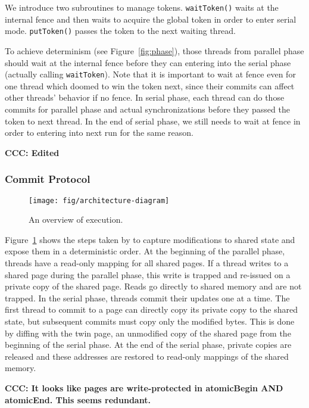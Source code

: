 We introduce two subroutines to manage tokens. \texttt{waitToken()}
waits at the internal fence and then waits to acquire the global token
in order to enter serial mode. \texttt{putToken()} passes the token to
the next waiting thread.

To achieve determinism (see Figure~\ref{fig:phase}), those threads from parallel phase 
should wait at the internal fence before they can entering into the serial phase (actually calling
\texttt{waitToken}).
Note that it is important to wait at fence even for one thread which doomed to win the token next,
since their commits can affect other threads' behavior if no fence.
In serial phase, each thread can do those commits for parallel phase and actual synchronizations
before they passed the token to next thread. 
In the end of serial phase, we still needs to wait at fence in order to entering into next run for the same reason.


\textbf{CCC: Edited}

\subsubsection{Commit Protocol}
\begin{figure}
{\centering
\texttt{[image: fig/architecture-diagram]}
\caption{An overview of \dthreads{} execution.\label{fig:architecture}}
}
\end{figure}

Figure~\ref{fig:architecture} shows the steps taken by \dthreads{} to capture modifications to shared state and expose them in a deterministic order.  At the beginning of the parallel phase, threads have a read-only mapping for all shared pages.  If a thread writes to a shared page during the parallel phase, this write is trapped and re-issued on a private copy of the shared page.  Reads go directly to shared memory and are not trapped.  In the serial phase, threads commit their updates one at a time.  The first thread to commit to a page can directly copy its private copy to the shared state, but subsequent commits must copy only the modified bytes.  This is done by diffing with the twin page, an unmodified copy of the shared page from the beginning of the serial phase.  At the end of the serial phase, private copies are released and these addresses are restored to read-only mappings of the shared memory.

\textbf{CCC: It looks like pages are write-protected in atomicBegin AND atomicEnd.  This seems redundant.}

